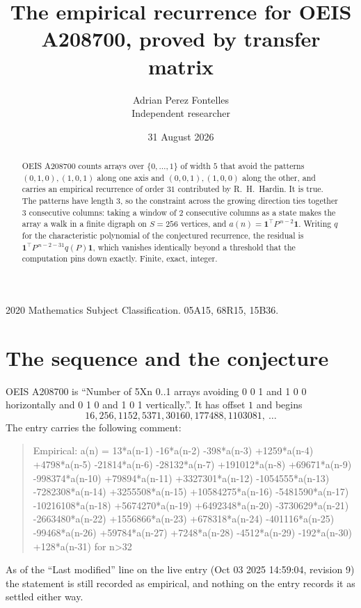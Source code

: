 \documentclass[11pt,a4paper]{article}
\title{The empirical recurrence for OEIS A208700, proved by transfer matrix}
\author{Adrian Perez Fontelles\\ \small Independent researcher}
\date{31 August 2026}
\theoremstyle{plain}
\theoremstyle{definition}
\begin{document}
\maketitle

\begin{abstract}
OEIS A208700 counts arrays over $\{0,\dots,1\}$ of width $5$ that avoid the patterns
$(0,1,0), (1,0,1)$ along one axis and $(0,0,1), (1,0,0)$ along the other, and carries an empirical recurrence of
order $31$ contributed by R.~H.~Hardin. It is true. The patterns have length $3$, so
the constraint across the growing direction ties together $3$ consecutive columns: taking a
window of $2$ consecutive columns as a state makes the array a walk in a finite digraph
on $S=256$ vertices, and $a(n)=\mathbf{1}^{\!\top}P^{\,n-2}\mathbf{1}$. Writing $q$
for the characteristic polynomial of the conjectured recurrence, the residual is
$\mathbf{1}^{\!\top}P^{\,n-2-31}q(P)\mathbf{1}$, which vanishes identically
beyond a threshold that the computation pins down exactly. Finite, exact, integer.
\end{abstract}

\noindent\small 2020 Mathematics Subject Classification. 05A15, 68R15, 15B36.\normalsize

\section{The sequence and the conjecture}

OEIS A208700 is ``Number of 5Xn 0..1 arrays avoiding 0 0 1 and 1 0 0 horizontally and 0 1 0 and 1 0 1 vertically.''. It has offset
$1$ and begins
\[
16, 256, 1152, 5371, 30160, 177488, 1103081,\ \dots
\]
The entry carries the following comment:
\begin{quote}\small
Empirical: a(n) = 13*a(n-1) -16*a(n-2) -398*a(n-3) +1259*a(n-4) +4798*a(n-5) -21814*a(n-6) -28132*a(n-7) +191012*a(n-8) +69671*a(n-9) -998374*a(n-10) +79894*a(n-11) +3327301*a(n-12) -1054555*a(n-13) -7282308*a(n-14) +3255508*a(n-15) +10584275*a(n-16) -5481590*a(n-17) -10216108*a(n-18) +5674270*a(n-19) +6492348*a(n-20) -3730629*a(n-21) -2663480*a(n-22) +1556866*a(n-23) +678318*a(n-24) -401116*a(n-25) -99468*a(n-26) +59784*a(n-27) +7248*a(n-28) -4512*a(n-29) -192*a(n-30) +128*a(n-31) for n>32
\end{quote}
As of the ``Last modified'' line on the live entry (Oct 03 2025 14:59:04, revision
9) the statement is still recorded as empirical, and nothing on the entry
records it as settled either way.
\end{document}
